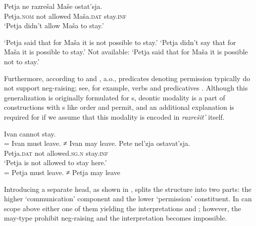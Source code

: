 \documentclass[output=paper,colorlinks,citecolor=brown,newtxmath]{langsci/langscibook}
\begin{document}
\ea\label{ex15}
\gll Petja	 ne	razrešal	Maše	ostat’sja.\\
    Petja.\textsc{nom} not allowed Maša.\textsc{dat} stay.\textsc{inf}\\
\glt `Petja didn't allow Maša to stay.'

\ea\label{ex15a}
`Petja said that for Maša it is not possible to stay.'
\ex\label{ex15b}
`Petja didn’t say that for Maša it is possible to stay.'
\ex\label{ex15c}
Not available: `Petja said that for Maša it is possible not to stay.'
\z
\z

\noindent Furthermore, according to \cite{vonFintelIatridou2007} and \cite{IatridouZeijlstra2013}, a.o., predicates denoting permission typically do not support neg-raising; see, for example,   verbs and   predicatives . Although this generalization is originally formulated for s, deontic modality is a part of constructions with s like order and permit, and an additional explanation is required for  if we assume that this modality is encoded in \textit{razrešit’}  itself.

\ea\label{ex16}
\ea\label{ex16a}
Ivan cannot stay. \\
= Ivan must leave. ≠ Ivan may leave.
\ex\label{ex16b}
\gll Pete nel’zja ostavat’sja.\\
    Petja.\textsc{dat} {not allowed.\textsc{sg.n}} stay.\textsc{inf}\\
\glt `Petja is not allowed to stay here.' \\
	= Petja must leave. ≠ Petja may leave
\z
\z

\noindent Introducing a separate  head, as shown in , splits the structure into two parts: the higher `communication’ component and the lower `permission’ constituent. In   can scope above either one of them yielding the interpretations  and ; however, the may-type  prohibit neg-raising and the interpretation  becomes impossible. \par
\end{document}
